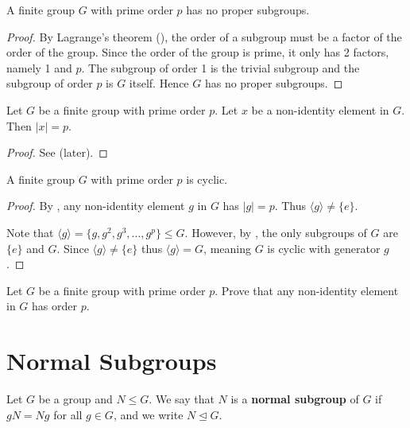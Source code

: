 \begin{corollary}\label{corollary-group-with-prime-order-subgroups}
    A finite group $G$ with prime order $p$ has no proper subgroups.
\end{corollary}
\begin{proof}
    By Lagrange's theorem (), the order of a subgroup must be a factor of the order of the group. Since the order of the group is prime, it only has 2 factors, namely 1 and $p$. The subgroup of order 1 is the trivial subgroup and the subgroup of order $p$ is $G$ itself. Hence $G$ has no proper subgroups.
\end{proof}

\begin{corollary}\label{corollary-prime-order-element}
    Let $G$ be a finite group with prime order $p$. Let $x$ be a non-identity element in $G$. Then $|x| = p$.
\end{corollary}
\begin{proof}
    See  (later).
\end{proof}

\begin{corollary}\label{corollary-group-with-prime-order-is-cyclic}
    A finite group $G$ with prime order $p$ is cyclic.
\end{corollary}
\begin{proof}
    By , any non-identity element $g$ in $G$ has $|g| = p$. Thus $\langle g \rangle \neq \{e\}$.

    Note that $\langle g \rangle = \{g, g^2, g^3, \dots, g^p\} \leq G$. However, by , the only subgroups of $G$ are $\{e\}$ and $G$. Since $\langle g \rangle \neq \{e\}$ thus $\langle g \rangle = G$, meaning $G$ is cyclic with generator $g$.
\end{proof}

\begin{exercise}\label{exercise-prime-order-element}
    Let $G$ be a finite group with prime order $p$. Prove that any non-identity element in $G$ has order $p$.
\end{exercise}

\section{Normal Subgroups}
\begin{definition}
    Let $G$ be a group and $N \leq G$. We say that $N$ is a \textbf{normal subgroup} of $G$ if $gN = Ng$ for all $g \in G$, and we write $N \unlhd G$.
\end{definition}

